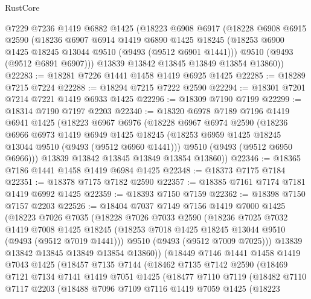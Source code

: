 \begin{lexlean}{RustCore}
\begin{coremodule}
    @7229
    @7236
    @1419
    @6882
    @1425
    (@18223
      @6908
      @6917
      (@18228
        @6908
        @6915
        @2590
        (@18236
          @6907
          @6914
          @1419
          @6890
          @1425
          @18245
          (@18253 @6900 @1425 @18245 @13044 @9510 (@9493 (@9512 @6901 @1441)))
          @9510
          (@9493 (@9512 @6891 @6907)))
        @13839
        @13842
        @13845
        @13849
        @13854
        @13860))
@22283 := @18281 @7226 @1441 @1458 @1419 @6925 @1425
@22285 := @18289 @7215 @7224
@22288 := @18294 @7215 @7222 @2590
@22294 := @18301 @7201 @7214 @7221 @1419 @6933 @1425
@22296 := @18309 @7190 @7199
@22299 := @18314 @7190 @7197 @2203
@22340 := @18320
    @6978
    @7189
    @7196
    @1419
    @6941
    @1425
    (@18223
      @6967
      @6976
      (@18228
        @6967
        @6974
        @2590
        (@18236
          @6966
          @6973
          @1419
          @6949
          @1425
          @18245
          (@18253 @6959 @1425 @18245 @13044 @9510 (@9493 (@9512 @6960 @1441)))
          @9510
          (@9493 (@9512 @6950 @6966)))
        @13839
        @13842
        @13845
        @13849
        @13854
        @13860))
@22346 := @18365 @7186 @1441 @1458 @1419 @6984 @1425
@22348 := @18373 @7175 @7184
@22351 := @18378 @7175 @7182 @2590
@22357 := @18385 @7161 @7174 @7181 @1419 @6992 @1425
@22359 := @18393 @7150 @7159
@22362 := @18398 @7150 @7157 @2203
@22526 := @18404
    @7037
    @7149
    @7156
    @1419
    @7000
    @1425
    (@18223
      @7026
      @7035
      (@18228
        @7026
        @7033
        @2590
        (@18236
          @7025
          @7032
          @1419
          @7008
          @1425
          @18245
          (@18253 @7018 @1425 @18245 @13044 @9510 (@9493 (@9512 @7019 @1441)))
          @9510
          (@9493 (@9512 @7009 @7025)))
        @13839
        @13842
        @13845
        @13849
        @13854
        @13860))
    (@18449
      @7146
      @1441
      @1458
      @1419
      @7043
      @1425
      (@18457
        @7135
        @7144
        (@18462
          @7135
          @7142
          @2590
          (@18469
            @7121
            @7134
            @7141
            @1419
            @7051
            @1425
            (@18477
              @7110
              @7119
              (@18482
                @7110
                @7117
                @2203
                (@18488
                  @7096
                  @7109
                  @7116
                  @1419
                  @7059
                  @1425
                  (@18223

\end{coremodule}
\end{lexlean}
